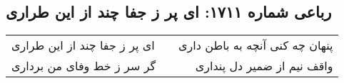 \begin{center}
\section*{رباعی شماره ۱۷۱۱: ای پر ز جفا چند از این طراری}
\label{sec:1711}
\begin{longtable}{l p{0.5cm} r}
ای پر ز جفا چند از این طراری
&&
پنهان چه کنی آنچه به باطن داری
\\
گر سر ز خط وفای من برداری
&&
واقف نیم از ضمیر دل پنداری
\\
\end{longtable}
\end{center}
